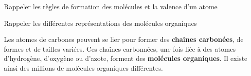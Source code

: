 \teteTermStssOrga


\begin{objectifs}
  \item Rappeler les règles de formation des molécules et la valence d'un atome
  \item Rappeler les différentes représentations des molécules organiques
\end{objectifs}

\begin{contexte}
  Les atomes de carbones peuvent se lier pour former des \textbf{chaines carbonées}, de formes et de tailles variées.
  Ces chaînes carbonnées, une fois liée à des atomes d'hydrogène, d'oxygène ou d'azote, forment des \textbf{molécules organiques}.
  Il existe ainsi des millions de molécules organiques différentes.

\end{contexte}



